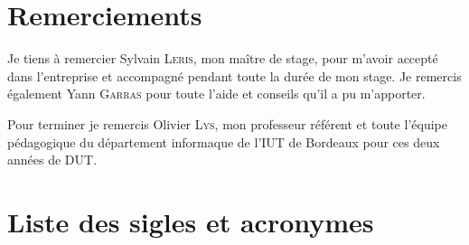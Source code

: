 \documentclass[a4paper,12pt]{book}
\makeatletter
\def\cleardoublepage{\clearpage\if@twoside \ifodd\c@page\else
  \hbox{}%
  \thispagestyle{empty}%
  \newpage%
  \if@twocolumn\hbox{}\newpage\fi\fi\fi}
\makeatother
\begin{document}
\endgroup

\chapter{Remerciements}
Je tiens à remercier Sylvain \textsc{Leris}, mon maître de stage, pour m'avoir accepté dans l'entreprise et accompagné pendant toute la durée de mon stage. Je remercis également Yann \textsc{Garras} pour toute l'aide et conseils qu'il a pu m'apporter.

Pour terminer je remercis Olivier \textsc{Lys}, mon professeur référent et toute l'équipe pédagogique du département informaque de l'IUT de Bordeaux pour ces deux années de DUT.

\tableofcontents

\listoffigures

\chapter{Liste des sigles et acronymes}
\begin{acronym}[CP-OFDMX] %
\end{acronym}


\mainmatter
\pagestyle{fancy}







\appendix



\end{document}
